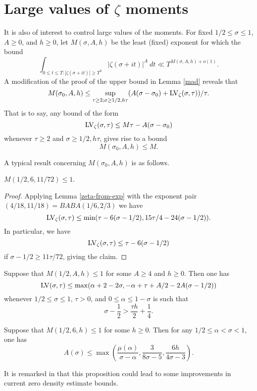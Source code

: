 \section{Large values of \texorpdfstring{$\zeta$}{zeta} moments}

It is also of interest to control large values of the moments.  For fixed $1/2 \leq \sigma \leq 1$, $A \geq 0$, and $h \geq 0$, let $M(\sigma,A,h)$ be the least (fixed) exponent for which the bound
$$ \int_{0 \leq t \leq T: |\zeta(\sigma+it)| \geq T^h} |\zeta(\sigma+it)|^A\ dt \ll T^{M(\sigma,A,h)+o(1)}.$$
A modification of the proof of the upper bound in Lemma \ref{mad} reveals that
\begin{equation}\label{msah}
    M(\sigma_0,A,h) \leq \sup_{\tau \geq 2; \sigma \geq 1/2, h\tau} (A(\sigma-\sigma_0) + \mathrm{LV}_\zeta(\sigma,\tau))/\tau.
\end{equation}
That is to say, any bound of the form
$$ \mathrm{LV}_\zeta(\sigma,\tau) \leq M \tau - A (\sigma - \sigma_0)$$
whenever $\tau \geq 2$ and $\sigma \geq 1/2, h\tau$, gives rise to a bound
$$ M(\sigma_0,A,h) \leq M.$$

A typical result concerning $M(\sigma_0,A,h)$ is as follows.

\begin{lemma}\label{ivic-6-large}\cite[(8.56)]{ivic} $M(1/2, 6, 11/72) \leq 1$.
\end{lemma}

\begin{proof} Applying Lemma \ref{zeta-from-exp} with the exponent pair $(4/18, 11/18) = BABA(1/6, 2/3)$ we have
$$  \mathrm{LV}_\zeta(\sigma,\tau) \leq \min( \tau - 6(\sigma-1/2), 15\tau/4 - 24 (\sigma-1/2) ).$$
In particular, we have
$$ \mathrm{LV}_\zeta(\sigma,\tau) \leq \tau - 6(\sigma-1/2)$$
if $\sigma - 1/2 \geq 11 \tau/72$, giving the claim.
\end{proof}

\begin{lemma}\label{bourgain-remark-1}\cite[Proposition 2]{bourgain_remarks_1995} Suppose that $M(1/2,A,h) \leq 1$ for some $A \geq 4$ and $h \geq 0$.  Then one has
    $$ \mathrm{LV}(\sigma,\tau) \leq \max( \alpha + 2 - 2 \sigma, -\alpha + \tau + A/2 - 2A (\sigma-1/2))$$
whenever $1/2 \leq \sigma \leq 1$, $\tau > 0$, and $0 \leq \alpha \leq 1-\sigma$ is such that
$$ \sigma - \frac{1}{2} > \frac{\tau h}{2} + \frac{1}{4}.$$
\end{lemma}

\begin{lemma}\label{bourgain-remark-2}\cite[Proposition 5]{bourgain_remarks_1995}  Suppose that $M(1/2,6,h) \leq 1$ for some $h \geq 0$.  Then for any $1/2 \leq \alpha < \sigma < 1$, one has
$$ A(\sigma) \leq \max( \frac{\mu(\alpha)}{\sigma-\alpha}, \frac{3}{8\sigma-5}, \frac{6h}{4\sigma-3}).$$
\end{lemma}

It is remarked in \cite{bourgain_remarks_1995} that this proposition could lead to some improvements in current zero density estimate bounds.
